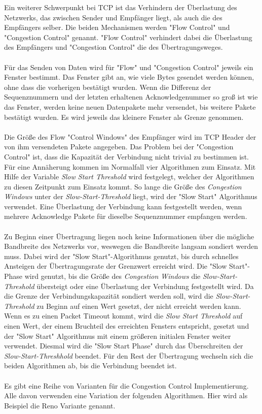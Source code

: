 Ein weiterer Schwerpunkt bei TCP ist das Verhindern der Überlastung des Netzwerks, das zwischen Sender und Empfänger liegt, als auch die des Empfängers selber. 
Die beiden Mechanismen werden "{}Flow Control"{} und "{}Congestion Control"{} genannt. 
{}"Flow Control{}" verhindert dabei die Überlastung des Empfängers und "{}Congestion Control"{} die des Übertragungsweges. \\\\
Für das Senden von Daten wird für "{}Flow"{} und "{}Congestion Control"{} jeweils ein Fenster bestimmt. Das Fenster gibt an, wie viele Bytes gesendet werden können, ohne dass die vorherigen bestätigt wurden. Wenn die Differenz der Sequenznummern und der letzten erhaltenen Acknowledgenummer so groß ist wie das Fenster, werden keine neuen Datenpakete mehr versendet, bis weitere Pakete bestätigt wurden. Es wird jeweils das kleinere Fenster als Grenze genommen. \\\\
Die Größe des Flow {}"Control Windows"{} des Empfänger wird im TCP Header der von ihm versendeten Pakete angegeben. 
Das Problem bei der "{}Congestion Control"{} ist, dass die Kapazität der Verbindung nicht trivial zu bestimmen ist. Für eine Annäherung kommen im Normalfall vier Algorithmen zum Einsatz. Mit Hilfe der Variable \textit{Slow Start Threshold} wird festgelegt, welcher der Algorithmen zu diesen Zeitpunkt zum Einsatz kommt. So lange die Größe des \textit{Congestion Windows} unter der \textit{Slow-Start-Threshold} liegt, wird der "{}Slow Start"{} Algorithmus verwendet. Eine Überlastung der Verbindung kann festgestellt werden, wenn mehrere Acknowledge Pakete für dieselbe Sequenznummer empfangen werden.\\\\
Zu Beginn einer Übertragung liegen noch keine Informationen über die mögliche Bandbreite des Netzwerks vor, weswegen die Bandbreite langsam sondiert werden muss. Dabei wird der "{}Slow Start"{}-Algorithmus genutzt, bis durch schnelles Ansteigen der Übertragungsrate der Grenzwert erreicht wird. Die "{}Slow Start"{}-Phase wird genutzt, bis die Größe des \textit{Congestion Windows} die \textit{Slow-Start-Threshold} übersteigt oder eine Überlastung der Verbindung festgestellt wird. Da die Grenze der Verbindungskapazität sondiert werden soll, wird die \textit{Slow-Start-Threshold} zu Beginn auf einen Wert gesetzt, der nicht erreicht werden kann. Wenn es zu einen Packet Timeout kommt, wird die \textit{Slow Start Threshold} auf einen Wert, der einem Bruchteil des erreichten Fensters entspricht, gesetzt und der "{}Slow Start"{} Algorithmus mit einem größeren initialen Fenster weiter verwendet. Diesmal wird die "{}Slow Start Phase"{} durch das Überschreiten der \textit{Slow-Start-Threshhold} beendet. Für den Rest der Übertragung wechseln sich die beiden Algorithmen ab, bis die Verbindung beendet ist.\\\\
Es gibt eine Reihe von Varianten für die Congestion Control Implementierung. Alle davon verwenden eine Variation der folgenden Algorithmen. Hier wird als Beispiel die Reno Variante genannt.\cite{TCPr,cc} 

